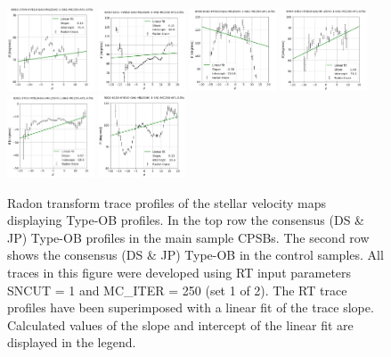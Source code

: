 \documentclass[fleqn,usenatbib]{mnras}
\begin{document}
\begin{figure}
    \centering
    \includegraphics[width=0.23\textwidth]{Images/LINFITS/CPSB-8082-3704-LINFIT-EBARS-MASKED.png}
    \includegraphics[width=0.23\textwidth]{Images/LINFITS/CPSB-8313-6101-LINFIT-EBARS-MASKED.png}
    \includegraphics[width=0.23\textwidth]{Images/LINFITS/CPSB-8938-6102-LINFIT-EBARS-MASKED.png}
    \includegraphics[width=0.23\textwidth]{Images/LINFITS/CPSB-8944-1902-LINFIT-EBARS-MASKED.png}
%
    \includegraphics[width=0.23\textwidth]{Images/LINFITS/CC0-8262-3703-LINFIT-EBARS-MASKED.png}
    \includegraphics[width=0.23\textwidth]{Images/LINFITS/CC1-9002-6103-LINFIT-EBARS-MASKED.png}
%
    \caption{Radon transform trace profiles of the stellar velocity maps displaying Type-OB profiles. In the top row the consensus (DS \& JP) Type-OB profiles in the main sample CPSBs. The second row shows the consensus (DS \& JP) Type-OB in the control samples. 
    All traces in this figure were developed using RT input parameters SNCUT = 1 and MC\_ITER = 250 (set 1 of 2). The RT trace profiles have been superimposed with a linear fit of the trace slope. Calculated values of the slope and intercept of the linear fit are displayed in the legend.}
    \label{fig:Radon-traces-Consensus-TYPE-OB-LINFITS}
\end{figure}
\end{document}
